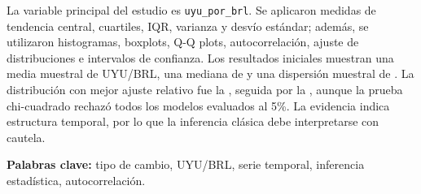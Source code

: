\documentclass[12pt,a4paper]{article}
\begin{document}
La variable principal del estudio es \texttt{uyu\_por\_brl}. Se aplicaron medidas de tendencia central, cuartiles, IQR, varianza y desvío estándar; además, se utilizaron histogramas, boxplots, Q-Q plots, autocorrelación, ajuste de distribuciones e intervalos de confianza. Los resultados iniciales muestran una media muestral de \MediaCambio{} UYU/BRL, una mediana de \MedianaCambio{} y una dispersión muestral de \DesvioCambio{}. La distribución con mejor ajuste relativo fue la \MejorDistribucionChi{}, seguida por la \SegundaDistribucionChi{}, aunque la prueba chi-cuadrado rechazó todos los modelos evaluados al 5\%. La evidencia indica estructura temporal, por lo que la inferencia clásica debe interpretarse con cautela.

\textbf{Palabras clave:} tipo de cambio, UYU/BRL, serie temporal, inferencia estadística, autocorrelación.

\newpage
{}










\nocite{actividad_final_pye}


\end{document}
